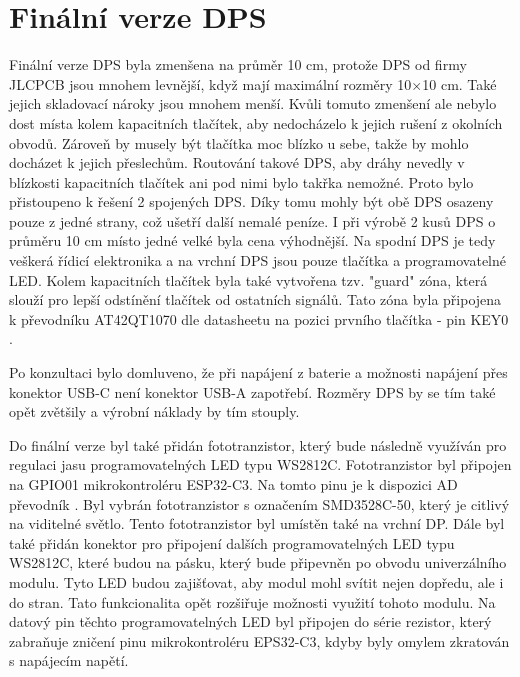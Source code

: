 \chapter{Finální verze DPS}
Finální verze DPS byla zmenšena na průměr 10 cm, protože DPS od firmy JLCPCB jsou mnohem levnější, když mají maximální rozměry 10$\times$10 cm. Také jejich skladovací nároky jsou mnohem  menší. 
Kvůli tomuto zmenšení ale nebylo dost místa 
kolem kapacitních tlačítek, aby nedocházelo k jejich rušení z okolních obvodů. Zároveň by musely být tlačítka moc blízko u sebe, takže by mohlo docházet k jejich přeslechům. Routování takové 
DPS, aby dráhy nevedly v blízkosti kapacitních tlačítek ani pod nimi bylo takřka nemožné. Proto bylo přistoupeno k řešení 2 spojených DPS. Díky tomu mohly být obě DPS osazeny pouze z jedné strany,
což ušetří další nemalé peníze. I při výrobě 2 kusů DPS o průměru 10 cm místo jedné velké byla cena výhodnější. Na spodní DPS je tedy veškerá řídicí elektronika a na vrchní DPS jsou pouze tlačítka 
a programovatelné LED. Kolem kapacitních tlačítek byla také vytvořena tzv. "guard" zóna, která slouží pro lepší odstínění tlačítek od ostatních signálů. Tato zóna byla připojena k převodníku AT42QT1070 
dle datasheetu na pozici prvního tlačítka - pin KEY0 \cite{conv_cap_but_AT42QT1070_dtsh}. 

Po konzultaci bylo domluveno, že při napájení z baterie a možnosti napájení přes konektor USB-C není konektor USB-A zapotřebí. Rozměry DPS by se tím také opět zvětšily a výrobní náklady by tím 
stouply. 

Do finální verze byl také přidán fototranzistor, který bude následně využíván pro regulaci jasu programovatelných LED typu WS2812C. Fototranzistor byl připojen na GPIO01 mikrokontroléru ESP32-C3. Na tomto 
pinu je k dispozici AD převodník \cite{ESP_C3_dtsh}. Byl vybrán fototranzistor s označením SMD3528C-50, který je citlivý na viditelné světlo. %
Tento fototranzistor byl umístěn také na vrchní DP. Dále byl také 
přidán konektor pro připojení dalších programovatelných LED typu WS2812C, které budou na pásku, který bude připevněn po obvodu univerzálního modulu. Tyto LED budou zajišťovat, aby modul mohl svítit 
nejen dopředu, ale i do stran. Tato funkcionalita opět rozšiřuje možnosti využití tohoto modulu. Na datový pin těchto programovatelných LED byl připojen do série rezistor, který zabraňuje zničení pinu 
mikrokontroléru EPS32-C3, kdyby byly omylem zkratován s napájecím napětí. 

